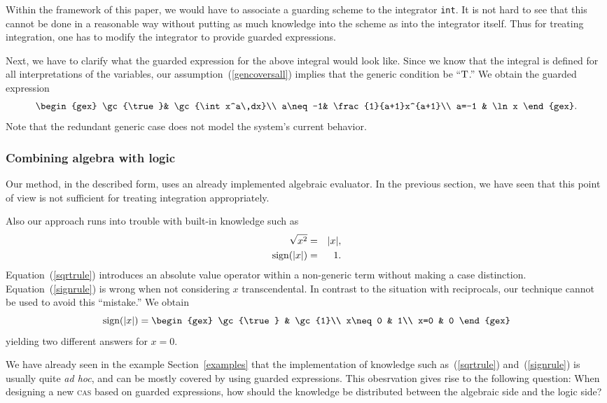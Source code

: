 Within the framework of this paper, we would have to associate a
guarding scheme to the integrator {\tt int}. It is not hard to see
that this cannot be done in a reasonable way without putting as much
knowledge into the scheme as into the integrator itself. Thus for
treating integration, one has to modify the integrator to provide
guarded expressions.

Next, we have to clarify what the guarded expression for the above
integral would look like. Since we know that the integral is defined
for all interpretations of the variables, our
assumption~(\ref{gencoversall}) implies that the generic condition be
``$\textrm{T}$.'' We obtain the guarded expression
\[
\begin{gex}
\gc{\true}& \gc{\int x^a\,dx}\\
a\neq-1& \frac{1}{a+1}x^{a+1}\\
a=-1 & \ln x
\end{gex}.
\]
Note that the redundant generic case does not model the system's
current behavior.
%
\subsubsection{Combining algebra with logic}
Our method, in the described form, uses an already implemented
algebraic evaluator. In the previous section, we have seen that this
point of view is not sufficient for treating integration
appropriately.

Also our approach runs into trouble with built-in knowledge such as
\begin{eqnarray}
\sqrt{x^2}&=&|x|\label{sqrtrule},\\
\textrm{sign}(|x|)&=&1\label{signrule}.
\end{eqnarray}
Equation~(\ref{sqrtrule}) introduces an absolute value operator within
a non-generic term without making a case distinction.
Equation~(\ref{signrule}) is wrong when not considering $x$
transcendental. In contrast to the situation with reciprocals, our
technique cannot be used to avoid this ``mistake.'' We obtain
\[
\sign(|x|)=\begin{gex}
\gc{\true} & \gc{1}\\
x\neq0 & 1\\
x=0 & 0
	   \end{gex}
\]
yielding two different answers for $x=0$.

We have already seen in the example Section~\ref{examples} that the
implementation of knowledge such as~(\ref{sqrtrule})
and~(\ref{signrule}) is usually quite {\it ad hoc}, and can be mostly
covered by using guarded expressions. This obesrvation gives rise to
the following question: When designing a new \textsc{cas} based on guarded
expressions, how should the knowledge be distributed between the
algebraic side and the logic side?
%
